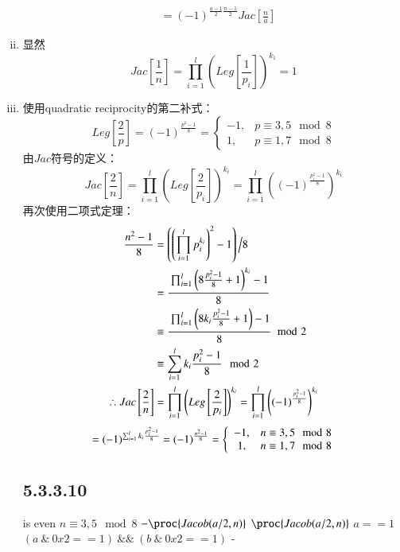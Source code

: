 \documentclass{article}
\begin{document}
\begin{enumerate}[(i)]
\[\begin{aligned}
			&=\left(-1\right)^{\frac{a-1}{2}\frac{n-1}{2}}Jac\left[\frac{n}{a}\right]
		\end{aligned}
		\]
		\item 显然
		\[
		Jac\left[\frac{1}{n}\right]=\prod_{i=1}^{l}\left(Leg\left[\frac{1}{p_i}\right]\right)^{k_1}=1
		\]
		\item 使用quadratic reciprocity的第二补式：
		\[
		Leg\left[\frac{2}{p}\right]=(-1)^{\frac{p^2-1}{8}}=\left\{
		\begin{array}{cl}
		-1,&p\equiv 3,5\mod 8\\
		1,&p\equiv 1,7\mod 8
		\end{array}
		\right.
		\]
		由$Jac$符号的定义：
		\[
		Jac\left[\frac{2}{n}\right]=\prod_{i=1}^{l}\left(Leg\left[\frac{2}{p_i}\right]\right)^{k_i}=\prod_{i=1}^{l}\left((-1)^{\frac{p_i^2-1}{8}}\right)^{k_i}
		\]
		再次使用二项式定理：
		\[
		\begin{aligned}
			\frac{n^2-1}{8}&=\left(\left(\prod_{i=1}^{l}p_i^{k_i}\right)^2-1\right)\Big /8\\
			&=\cfrac{\prod_{i=1}^{l}\left(8\frac{p_i^2-1}{8}+1\right)^{k_i}-1}{8}\\
			&\equiv\cfrac{\prod_{i=1}^{l}\left(8k_i\frac{p_i^2-1}{8}+1\right)-1}{8}\mod 2\\
			&\equiv \sum_{i=1}^{l}k_i\frac{p_i^2-1}{8}\mod 2\\
			\therefore Jac\left[\frac{2}{n}\right]&=\prod_{i=1}^{l}\left(Leg\left[\frac{2}{p_i}\right]\right)^{k_i}=\prod_{i=1}^{l}\left((-1)^{\frac{p_i^2-1}{8}}\right)^{k_i}
		\end{aligned}
		\]
		\[
		\\
		=(-1)^{\sum_{i=1}^{l}k_i\frac{p_i^2-1}{8}}=(-1)^{\frac{n^2-1}{8}}=\left\{
		\begin{array}{cl}
		-1,&n\equiv 3,5\mod 8\\
		1,&n\equiv 1,7\mod 8
		\end{array}
		\right.
		\]
		\subsection*{5.3.3.10}
		\begin{codebox}
			\zi {}\li 
			\If {} is even\Then\li 
			\If $n\equiv 3,5\mod 8$\Then\li 
			\Return $-\proc{Jacob(a/2,n)}$\li  
			\Else\li 
			\Return $\proc{Jacob(a/2,n)}$\End\End \li 
			\If $a==1$\Then\li 
			\End\li 
			\If $(a\ \&\ 0x2==1)\ \&\&\ (b\ \&\ 0x2==1)$\Then\li 
			\Return -\proc{Jacob$(n\mod a,a)$}\li   
			\Else\li 
			\Return {}
		\end{codebox}
	\end{enumerate}
\end{document}
